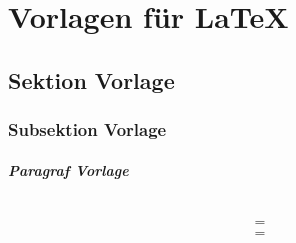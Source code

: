 \chapter{Vorlagen für LaTeX}
\label{Kapitel_Vorlage}


\section{Sektion Vorlage}
\label{Sektion_Vorlage}

\subsection{Subsektion Vorlage}
\label{Subsektion_Vorlagen}


 \label{MiniSek_Vorlagen}

\paragraph{Paragraf Vorlage} \label{Paragraf_}


\begin{equation}
 \label{Gleichung_1}
\end{equation}


\begin{eqnarray}
\label{Gleichung_2}
 \nonumber
 &=&
 \\
 &=&
 \\
\end{eqnarray}


